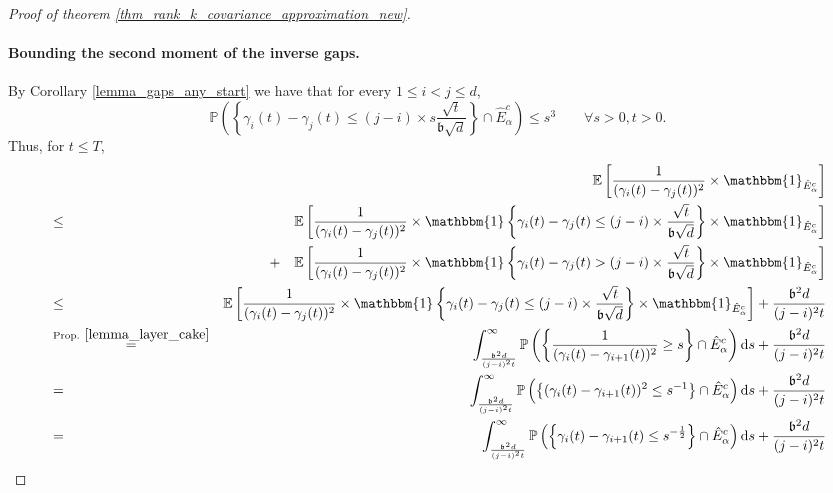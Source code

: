 \documentclass[11pt,letterpaper]{article}
\begin{document}
\begin{proof}[Proof of theorem \ref{thm_rank_k_covariance_approximation_new}]
\paragraph{Bounding the second moment of the inverse gaps.}
By Corollary \ref{lemma_gaps_any_start} we have that for every $1\leq i < j \leq d$,
%
\begin{equation}\label{eq_v1}
    \mathbb{P}\left(\left\{ \gamma_i(t) - \gamma_{j}(t) \leq (j-i) \times s \frac{\sqrt{t}}{\mathfrak{b}\sqrt{d}} \right\} \cap \hat{E}_\alpha^c\right) \leq  s^3 \qquad \forall s>0, t>0.
\end{equation}
%
Thus, for $t \leq T$,
%
\begin{eqnarray} \label{eq_second_inverse_moment}
    & &\!\!\! \! \!\! \! \!\!\!\!\!\!\!\!\!\!\!\!\!\!\!\! \! \!\! \! \!\!\!\!\!\!\!\!\!\!\!\!\!\!\!\! \! \! \mathbb{E}\left[\frac{1}{(\gamma_i(t) - \gamma_{j}(t))^2}  \times \mathbbm{1}_{\hat{E}_\alpha^c}\right]\nonumber\\
     &\leq & \mathbb{E}\left[\frac{1}{(\gamma_i(t) - \gamma_{j}(t))^2} \times \mathbbm{1}\left\{\gamma_i(t) - \gamma_{j}(t) \leq (j-i) \times \frac{\sqrt{t}}{ \mathfrak{b}\sqrt{d}}\right\}  \times \mathbbm{1}_{\hat{E}_\alpha^c}\right]\nonumber\\
     & & + \quad  \mathbb{E}\left[\frac{1}{(\gamma_i(t) - \gamma_{j}(t))^2} \times \mathbbm{1}\left\{\gamma_i(t) - \gamma_{j}(t) > (j-i) \times \frac{\sqrt{t}}{ \mathfrak{b}\sqrt{d}}\right\}  \times \mathbbm{1}_{\hat{E}_\alpha^c}\right] \nonumber\\
    &\leq & \mathbb{E}\left[\frac{1}{(\gamma_i(t) - \gamma_{j}(t))^2} \times \mathbbm{1}\left\{\gamma_i(t) - \gamma_{j}(t) \leq (j-i) \times \frac{\sqrt{t}}{ \mathfrak{b}\sqrt{d}}\right\}  \times \mathbbm{1}_{\hat{E}_\alpha^c}\right] + \frac{\mathfrak{b}^2 d}{(j-i)^2 t} \label{eq_n147}\\
    &\stackrel{\textrm{Prop. } \ref{lemma_layer_cake}}{=}& \int_{\frac{\mathfrak{b}^2d}{(j-i)^2 t}}^{\infty}   \mathbb{P}\left(\left\{\frac{1}{(\gamma_i(t) - \gamma_{i+1}(t))^2} \geq s \right\} \cap \hat{E}_\alpha^c \right) \mathrm{d}s + \frac{\mathfrak{b}^2 d}{(j-i)^2 t} \label{eq_n148}\\
    &=& \int_{\frac{\mathfrak{b}^2 d}{(j-i)^2 t}}^{\infty}   \mathbb{P}\left(\left\{(\gamma_i(t) - \gamma_{i+1}(t))^2 \leq s^{-1}  \right\} \cap \hat{E}_\alpha^c \right)  \mathrm{d}s + \frac{\mathfrak{b}^2 d}{(j-i)^2 t} \nonumber\\
    &=& \int_{\frac{\mathfrak{b}^2 d}{(j-i)^2 t}}^{\infty}   \mathbb{P}\left(\left\{\gamma_i(t) - \gamma_{i+1}(t) \leq s^{-\frac{1}{2}}\right\} \cap \hat{E}_\alpha^c\right) \mathrm{d}s + \frac{\mathfrak{b}^2 d}{(j-i)^2 t}\nonumber\\

\end{eqnarray}
\end{proof}
\end{document}
